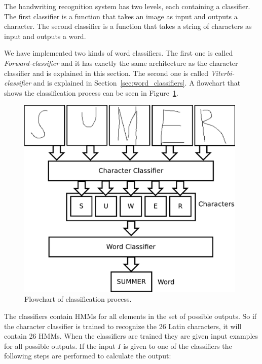 
The handwriting recognition system has two levels, each containing a classifier. 
The first classifier is a function that takes an image as input and outputs a character. 
The second classifier is a function that takes a string of characters as input and outputs a word.

We have implemented two kinds of word classifiers.
The first one is called \emph{Forward-classifier} and it has exactly the same architecture as the character classifier and is explained in this section.
The second one is called \emph{Viterbi-classifier} and is explained in Section~\ref{sec:word_classifiers}.
A flowchart that shows the classification process can be seen in Figure~\ref{fig:classification_system_overview}. 

    \begin{figure}[htb] 
      \begin{center}
	\leavevmode
	\includegraphics[width=110mm]{classification_system_overview.pdf}%
      \end{center}
      \caption{Flowchart of classification process.}
      \label{fig:classification_system_overview}
    \end{figure}

The classifiers contain HMMs for all elements in the set of possible outputs. 
So if the character classifier is trained to recognize the 26 Latin characters, it will contain 26 HMMs. 
When the classifiers are trained they are given input examples for all possible outputs. 
If the input $I$ is given to one of the classifiers the following steps are performed to calculate the output:

